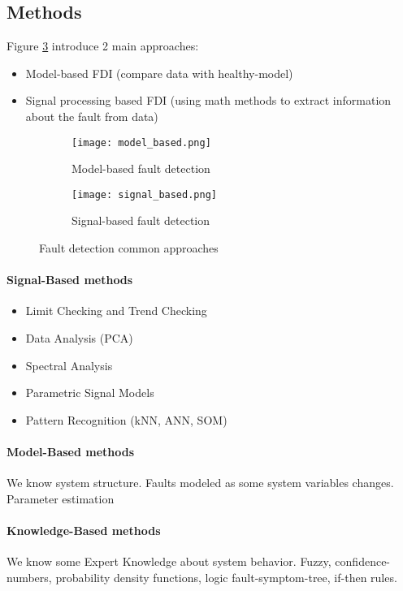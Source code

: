 \subsection{Methods}
Figure \ref{fig:fault_detection} introduce 2 main approaches:

\begin{itemize}
\item{Model-based FDI (compare data with healthy-model)}
\item{Signal processing based FDI (using math methods to extract information
    about the fault from data)}
\end{itemize}

\begin{figure}[h]
    \centering
\begin{subfigure}{0.5\textwidth}
    \texttt{[image: model\_based.png]}
    \caption{Model-based fault detection}
    \label{fig:model_based}
\end{subfigure}%
\begin{subfigure}{0.5\textwidth}
    \texttt{[image: signal\_based.png]}
    \caption{Signal-based fault detection}
    \label{fig:signal_based}
\end{subfigure}
\caption{Fault detection common approaches}
\label{fig:fault_detection}
\end{figure}

\paragraph{Signal-Based methods}
\begin{itemize}
    \item Limit Checking and Trend Checking
    \item Data Analysis (PCA)
    \item Spectral Analysis
    \item Parametric Signal Models
    \item Pattern Recognition (kNN, ANN, SOM)
\end{itemize}

\paragraph{Model-Based methods}
We know system structure. Faults modeled as some system variables changes.
Parameter estimation

\paragraph{Knowledge-Based methods}
We know some Expert Knowledge about system behavior. Fuzzy,
confidence-numbers, probability density functions, logic
fault-symptom-tree, if-then rules.

